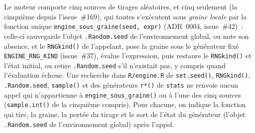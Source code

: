 \documentclass[a4paper,11pt]{article}
\newcommand{\code}[1]{\texttt{\small #1}}
\begin{document}
Le moteur comporte cinq sources de tirages aléatoires, et cinq seulement (la cinquième depuis
l'issue~\#169), qui toutes
s'exécutent sous \emph{graine locale} par la fonction unique \code{engine\_sous\_graine(seed,
expr)} (ADR~0004, issue~\#42)~: celle-ci sauvegarde l'objet \code{.Random.seed} de
l'environnement global, ou note son absence, et le \code{RNGkind()} de l'appelant, pose la
graine sous le générateur fixé \code{ENGINE\_RNG\_KIND} (issue~\#37), évalue l'expression, puis
restaure le \code{RNGkind()} et l'état initial, ou retire \code{.Random.seed} s'il n'existait
pas, y compris quand l'évaluation échoue. Une recherche dans \code{R/engine.R} de \code{set.seed()}, \code{RNGkind()},
\code{.Random.seed}, \code{sample()} et des générateurs \code{r*()} de \code{stats} ne renvoie
aucun appel qui n'appartienne à \code{engine\_sous\_graine()} ou à l'une des cinq sources
(\code{sample.int()} de la cinquième compris).
Pour chacune, on indique la fonction qui tire, la graine, la portée du tirage et le sort de
l'état du générateur (l'objet \code{.Random.seed} de l'environnement global) après l'appel.
\end{document}
